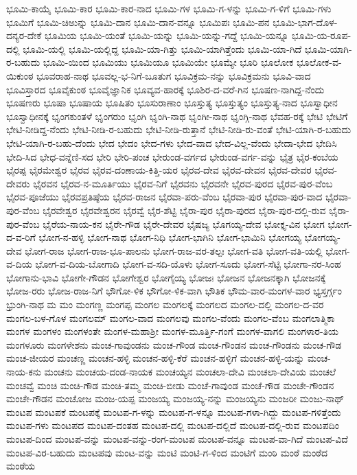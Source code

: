 ಭೂಮಿ-ಕಾಯೈ
ಭೂಮಿ-ಕಾರ
ಭೂಮಿ-ಕಾರ-ನಾದ
ಭೂಮಿ-ಗಳ
ಭೂಮಿ-ಗ-ಳನ್ನು
ಭೂಮಿ-ಗ-ಳಿಗೆ
ಭೂಮಿ-ಗಳು
ಭೂಮಿಗೆ
ಭೂಮಿ-ಚಿಅುನ್ನು
ಭೂಮಿ-ದಾನ
ಭೂಮಿ-ದಾನ-ವನ್ನೂ
ಭೂಮಿಪಃ
ಭೂಮಿ-ಪನ
ಭೂಮಿ-ಭಾಗ-ದೊಳ-ದನ್ಯರ-ದೇಕೆ
ಭೂಮಿಯ
ಭೂಮಿ-ಯಂತೆ
ಭೂಮಿ-ಯನ್ನು
ಭೂಮಿ-ಯನ್ನು-ಗದ್ದೆ
ಭೂಮಿ-ಯನ್ನೂ
ಭೂಮಿ-ಯ-ರೂಪ-ದಲ್ಲಿ
ಭೂಮಿ-ಯಲ್ಲಿ
ಭೂಮಿ-ಯಲ್ಲಿದ್ದ
ಭೂಮಿ-ಯಾ-ಗಿತ್ತು
ಭೂಮಿ-ಯಾಗಿತ್ತೆಂದು
ಭೂಮಿ-ಯಾ-ಗಿದೆ
ಭೂಮಿ-ಯಾಗಿ-ರ-ಬಹುದು
ಭೂಮಿ-ಯಿಂದ
ಭೂಮಿಯು
ಭೂಮಿಯೂ
ಭೂಮಿಯೇ
ಭೂಮ್ಯೇ
ಭೂರಿ
ಭೂಲೋಕ
ಭೂಲೋಕ-ವ-ಯಿಕುಂಠ
ಭೂವರಾಹ-ನಾಥ
ಭೂವಲ್ಲ-ಭ-ನಿಗೆ-ಬೂತುಗ
ಭೂವಿಕ್ರಮ-ನನ್ನು
ಭೂವಿಕ್ರಮನು
ಭೂವಿ-ವಾದ
ಭೂವಿಸ್ತಾರದ
ಭೂವೈಕುಂಠ
ಭೂವೈಜ್ಞಾನಿಕ
ಭೂವ್ಯವ-ಹಾರಕ್ಕೆ
ಭೂಶಿರ-ದ-ವರೆ-ಗಿನ
ಭೂಷಣ-ನಾಗಿದ್ದ-ನೆಂದು
ಭೂಷಣರು
ಭೂಷಾ
ಭೂಷಾಯ
ಭೂಷಿತಂ
ಭೂಸುರಾಣಾಂ
ಭೂಸ್ತುತ್ಯ
ಭೂಸ್ತುತ್ಯಂ
ಭೂಸ್ತುತ್ಯ-ನಾದ
ಭೂಸ್ವಾಧೀನ
ಭೂಸ್ವಾಧೀನಕ್ಕೆ
ಭೃಂಗಕುಂತಳೆ
ಭೃಂಗರುಂ
ಭೃಂಗಿ
ಭೃಂಗಿ-ನಾಥ
ಭೃಂಗೀ-ನಾಥ
ಭೃಂಗ್ಗಿ-ನಾಥ
ಭೆವಹ-ರಕ್ಕೆ
ಭೇಟಿ
ಭೇಟಿಗೆ
ಭೇಟಿ-ನೀಡಿದ್ದ-ನೆಂದು
ಭೇಟಿ-ನೀಡಿ-ರ-ಬಹುದು
ಭೇಟಿ-ನೀಡಿ-ರುತ್ತಾನೆ
ಭೇಟಿ-ನೀಡಿ-ರು-ವಂತೆ
ಭೇಟಿ-ಯಾಗಿ-ರ-ಬಹುದು
ಭೇಟಿ-ಯಾಗಿ-ರ-ಬಹು-ದೆಂದು
ಭೇದ
ಭೇದಂ
ಭೇದ-ಗಳು
ಭೇದ-ವಾದ
ಭೇದ-ವಿಲ್ಲ-ವೆಂದು
ಭೇದಾ-ಭೇದ
ಭೇದಿಸಿ
ಭೇದಿ-ಸಿದ
ಭೇಧ-ವನ್ನೆಣಿ-ಸದ
ಭೇರಿ
ಭೇರಿ-ಪಂಚ
ಭೇರುಂಡ-ವರ್ಗದ
ಭೇರುಂಡ-ವರ್ಗ-ವನ್ನು
ಭೈತ್ರ
ಭೈರ-ಕಂಬೆಯ
ಭೈರಪ್ಪ
ಭೈರಮೇಶ್ವರ
ಭೈರವ
ಭೈರವ-ದಂಣಾಯ-ಕಿತ್ತಿ-ಯರ
ಭೈರವ-ದೇವ
ಭೈರವ-ದೇವನ
ಭೈರವ-ದೇವರ
ಭೈರವ-ದೇವರು
ಭೈರವನ
ಭೈರವ-ನ-ಮೂರ್ತಿಯು
ಭೈರವ-ನಿಗೆ
ಭೈರವನು
ಭೈರವನೇ
ಭೈರವ-ಪುರದ
ಭೈರವ-ಪುರ-ವೆಂಬ
ಭೈರವ-ಪೂಜೆಯು
ಭೈರವಪ್ರತಿಷ್ಠೆಯ
ಭೈರವ-ರಾಜನ
ಭೈರವಾ-ಪರು-ವೆಂಬ
ಭೈರವಾ-ಪುರ
ಭೈರವಾ-ಪುರ-ವಾದ
ಭೈರವಾ-ಪುರ-ವೆಂಬ
ಭೈರವೇಶ್ವರ
ಭೈರವೇಶ್ವರನ
ಭೈರವ್ವೆ
ಭೈರ-ಶೆಟ್ಟಿ
ಭೈರಾ-ಪುರ
ಭೈರಾ-ಪುರದ
ಭೈರಾ-ಪುರ-ದಲ್ಲಿ-ರುವ
ಭೈರಾ-ಪುರ-ವೆಂಬ
ಭೈರೆಯ-ನಾಯ-ಕನ
ಭೈರೇ-ಗೌಡ
ಭೈರೇ-ದೇವರ
ಭೈಷಜ್ಯ
ಭೊಗಯ್ಯ-ದೇವ
ಭೋಕ್ತೃ-ವಿನ
ಭೋಗ
ಭೋಗ-ದ-ವ-ರಿಗೆ
ಭೋಗ-ನ-ಹಳ್ಳಿ
ಭೋಗ-ನಾಥ
ಭೋಗ-ನಿಧಿ
ಭೋಗ-ಭಾಗಿನಿ
ಭೋಗ-ಭಾಮಿನಿ
ಭೋಗಯ್ಯ
ಭೋಗಯ್ಯ-ದೇವ
ಭೋಗ-ರಾಜ
ಭೋಗ-ರಾಜ-ಭೂ-ಪಾಲನು
ಭೋಗ-ರಾಜ-ವರ-ತಲ್ಪಃ
ಭೋಗ-ವತಿ
ಭೋಗ-ವತಿ-ಯಲ್ಲಿ
ಭೋಗ-ವ-ದಿಯ
ಭೋಗ-ವ-ದಿಯ-ಬೋಗಾದಿ
ಭೋಗ-ವ-ಸದಿ-ಯೊಳು
ಭೋಗ-ಸೂದು
ಭೋಗ-ಸೆಟ್ಟಿ
ಭೋಗಾ-ನರ-ಸಿಂಹ
ಭೋಗಾನು-ಭಾವಿ
ಭೋಗೇ-ಗೌಡನ
ಭೋಗೇಶ್ವರ
ಭೋಗೈಯ್ಯ
ಭೋಜಃ
ಭೋಜನ
ಭೋಜನಕ್ಕಾಗಿ
ಭೋಜನಕ್ಕೆ
ಭೋಜ-ರರು
ಭೋಜ-ರಾಜ-ನಿಗೆ
ಭೌಗೋ-ಳಿಕ
ಭೌಗೋ-ಳಿಕ-ವಾಗಿ
ಭೌತಿಕ
ಭೌಮ-ವಾರ-ಮಂಗಳ-ವಾರ
ಭ್ಯಸ್ತರ್ಗ್ಗಂ
ಭ್ರುಂಗಿ-ನಾಥ
ಮ
ಮಂ
ಮಂಗಣ್ಣ
ಮಂಗಪ್ಪ
ಮಂಗಲ
ಮಂಗಲಕ್ಕೆ
ಮಂಗಲದ
ಮಂಗಲ-ದಲ್ಲಿ
ಮಂಗಲ-ದ-ವರ
ಮಂಗಲ-ಬಳ-ಗೊಳ
ಮಂಗಲಮ್
ಮಂಗಲ-ವಾದ
ಮಂಗಲವು
ಮಂಗಲ-ವೆಂದು
ಮಂಗಲ-ವೆಂಬ
ಮಂಗಲಾತ್ಮಿಕಾ
ಮಂಗಳ
ಮಂಗಳಂ
ಮಂಗಳಂತೇ
ಮಂಗಳ-ಮಹಾಶ್ರೀ
ಮಂಗಳ-ಮೂರ್ತ್ತಿ-ಗಂಗೆ
ಮಂಗಳ-ವಾಗಲಿ
ಮಂಗಳಾರ-ತಿಯ
ಮಂಗಳೂರು
ಮಂಗಳೇಶನು
ಮಂಚ-ಗಾವುಂಡನು
ಮಂಚ-ಗೌಂಡ
ಮಂಚ-ಗೌಂಡನ
ಮಂಚ-ಗೌಂಡನು
ಮಂಚ-ಗೌಡ
ಮಂಚ-ಜೀಯರ
ಮಂಚಣ್ಣ
ಮಂಚನ-ಹಳ್ಳಿ
ಮಂಚನ-ಹಳ್ಳಿ-ಕೆರೆ
ಮಂಚನ-ಹಳ್ಳಿಗೆ
ಮಂಚನ-ಹಳ್ಳಿ-ಯನ್ನು
ಮಂಚ-ನಾಯ-ಕನು
ಮಂಚನು
ಮಂಚಯ-ದಂಡ-ನಾಯಕ
ಮಂಚಯ್ಯನ
ಮಂಚಲಾ-ದೇವಿ
ಮಂಚಲಾ-ದೇವಿಯ
ಮಂಚಲೆ
ಮಂಚವ್ವೆ
ಮಂಚಿ
ಮಂಚಿ-ಗೌಡ
ಮಂಚಿ-ತಮ್ಮ
ಮಂಚಿ-ಬೀಡು
ಮಂಚೆ-ಗಾವುಂಡ
ಮಂಚೆ-ಗೌಡ
ಮಂಚೇ-ಗೌಂಡನ
ಮಂಚೇ-ಗೌಡನ
ಮಂಚೋಜ
ಮಂಜ-ಯಪ್ಪ
ಮಂಜಯ್ಯ
ಮಂಜಯ್ಯ-ನನ್ನು
ಮಂಜಯ್ಯನು
ಮಂಜರೀ
ಮಂಜು-ನಾಥ್
ಮಂಟಪ
ಮಂಟಪಕೆ
ಮಂಟಪಕ್ಕೆ
ಮಂಟಪ-ಗ-ಳನ್ನು
ಮಂಟಪ-ಗ-ಳನ್ನೂ
ಮಂಟಪ-ಗಳಾ-ಗಿದ್ದು
ಮಂಟಪ-ಗಳಿತ್ತೆಂದು
ಮಂಟಪ-ಗಳು
ಮಂಟಪದ
ಮಂಟಪ-ದಂತಹ
ಮಂಟಪ-ದಲ್ಲಿ
ಮಂಟಪ-ದಲ್ಲಿದೆ
ಮಂಟಪ-ದಲ್ಲಿ-ರುವ
ಮಂಟಪದಿಂ
ಮಂಟಪ-ದಿಂದ
ಮಂಟಪ-ವನ್ನು
ಮಂಟಪ-ವನ್ನು-ರಂಗ-ಮಂಟಪ
ಮಂಟಪ-ವನ್ನೂ
ಮಂಟಪ-ವಾ-ಗಿದೆ
ಮಂಟಪ-ವಿದೆ
ಮಂಟಪ-ವಿರ-ಬಹುದು
ಮಂಟಪವು
ಮಂಟ-ವನ್ನು
ಮಂಟಿ
ಮಂಟಿ-ಗ-ಳಿಂದ
ಮಂಟಿಗೆ
ಮಂಠಿ
ಮಂಠೆ
ಮಂಠೆದ
ಮಂಠೆಯ
